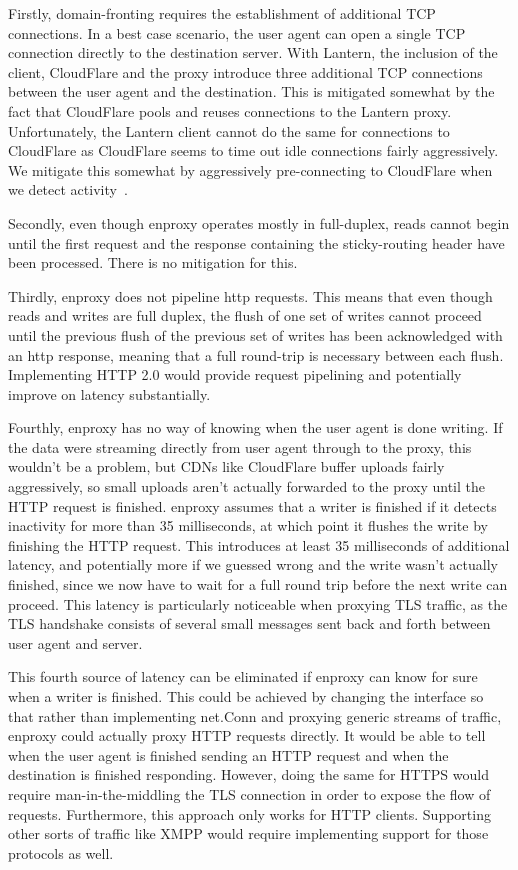 \documentclass{sig-alternate}
\begin{document}
Firstly, domain-fronting requires the establishment of additional TCP
connections. In a best case scenario, the user agent can open a single TCP
connection directly to the destination server.  With Lantern, the inclusion
of the client, CloudFlare and the proxy introduce three additional TCP
connections between the user agent and the destination.  This is mitigated
somewhat by the fact that CloudFlare pools and reuses connections to the
Lantern proxy.  Unfortunately, the Lantern client cannot do the same for
connections to CloudFlare as CloudFlare seems to time out idle connections
fairly aggressively.  We mitigate this somewhat by aggressively
pre-connecting to CloudFlare when we detect activity~\cite{connpool}.

Secondly, even though enproxy operates mostly in full-duplex, reads cannot
begin until the first request and the response containing the
sticky-routing header have been processed. There is no mitigation for this.

Thirdly, enproxy does not pipeline http requests.  This means that even
though reads and writes are full duplex, the flush of one set of writes
cannot proceed until the previous flush of the previous set of writes has
been acknowledged with an http response, meaning that a full round-trip is
necessary between each flush. Implementing HTTP 2.0 would provide request
pipelining and potentially improve on latency substantially.

Fourthly, enproxy has no way of knowing when the user agent is done
writing.  If the data were streaming directly from user agent through to
the proxy, this wouldn't be a problem, but CDNs like CloudFlare buffer
uploads fairly aggressively, so small uploads aren't actually forwarded to
the proxy until the HTTP request is finished.  enproxy assumes that a
writer is finished if it detects inactivity for more than 35 milliseconds,
at which point it flushes the write by finishing the HTTP request.  This
introduces at least 35 milliseconds of additional latency, and potentially
more if we guessed wrong and the write wasn't actually finished, since we
now have to wait for a full round trip before the next write can proceed.
This latency is particularly noticeable when proxying TLS traffic, as the
TLS handshake consists of several small messages sent back and forth
between user agent and server.

This fourth source of latency can be eliminated if enproxy can know for
sure when a writer is finished. This could be achieved by changing the
interface so that rather than implementing net.Conn and proxying generic
streams of traffic, enproxy could actually proxy HTTP requests directly. It
would be able to tell when the user agent is finished sending an HTTP
request and when the destination is finished responding.  However, doing
the same for HTTPS would require man-in-the-middling the TLS connection in
order to expose the flow of requests.  Furthermore, this approach only
works for HTTP clients.  Supporting other sorts of traffic like XMPP would
require implementing support for those protocols as well.
\end{document}
